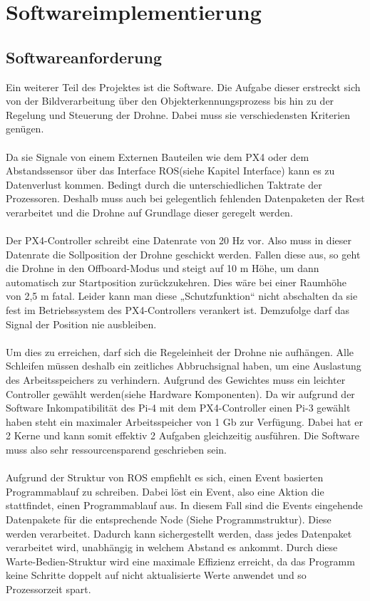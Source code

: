 \chapter{Softwareimplementierung}
\section{Softwareanforderung}
Ein weiterer Teil des Projektes ist die Software. Die Aufgabe dieser erstreckt sich von der Bildverarbeitung über den Objekterkennungsprozess bis hin zu der Regelung und Steuerung der Drohne. Dabei muss sie verschiedensten Kriterien genügen.\\
\\
Da sie Signale von einem Externen Bauteilen wie dem PX4 oder dem Abstandssensor über das Interface ROS(siehe Kapitel Interface) kann es zu Datenverlust kommen. Bedingt durch die unterschiedlichen Taktrate der Prozessoren. Deshalb muss auch bei gelegentlich fehlenden Datenpaketen der Rest verarbeitet und die Drohne auf Grundlage dieser geregelt werden.\\
\\
Der PX4-Controller schreibt eine Datenrate von 20 Hz vor. Also muss in dieser Datenrate die Sollposition der Drohne geschickt werden. Fallen diese aus, so geht die Drohne in den Offboard-Modus und steigt auf 10 m Höhe, um dann automatisch zur Startposition zurückzukehren. Dies wäre bei einer Raumhöhe von 2,5 m fatal. Leider kann man diese „Schutzfunktion“ nicht abschalten da sie fest im Betriebssystem des PX4-Controllers verankert ist. Demzufolge darf das Signal der Position nie ausbleiben.\\
\\
Um dies zu erreichen, darf sich die Regeleinheit der Drohne nie aufhängen. Alle Schleifen müssen deshalb ein zeitliches Abbruchsignal haben, um eine Auslastung des Arbeitsspeichers zu verhindern. Aufgrund des Gewichtes muss ein leichter Controller gewählt werden(siehe Hardware Komponenten). Da wir aufgrund der Software Inkompatibilität des Pi-4 mit dem PX4-Controller einen Pi-3 gewählt haben steht ein maximaler Arbeitsspeicher von 1 Gb zur Verfügung. Dabei hat er 2 Kerne und kann somit effektiv 2 Aufgaben gleichzeitig ausführen. Die Software muss also sehr ressourcensparend geschrieben sein.\\
\\
Aufgrund der Struktur von ROS empfiehlt es sich, einen Event basierten Programmablauf zu schreiben. Dabei löst ein Event, also eine Aktion die stattfindet, einen Programmablauf aus. In diesem Fall sind die Events eingehende Datenpakete für die entsprechende Node (Siehe Programmstruktur). Diese werden verarbeitet. Dadurch kann sichergestellt werden, dass jedes Datenpaket verarbeitet wird, unabhängig in welchem Abstand es ankommt. Durch diese Warte-Bedien-Struktur wird eine maximale Effizienz erreicht, da das Programm keine Schritte doppelt auf nicht aktualisierte Werte anwendet und so Prozessorzeit spart.
